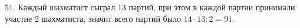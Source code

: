 51. Каждый шахматист сыграл 13 партий, при этом в каждой партии принимали участие 2 шахматиста, значит всего партий было  $14\cdot13:2=91.$\\
